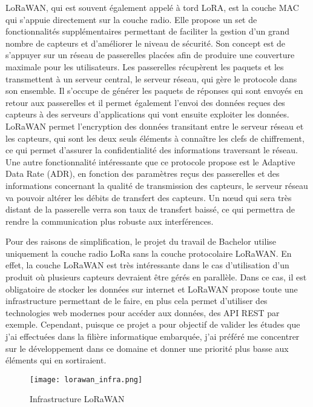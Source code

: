 LoRaWAN, qui est souvent également appelé à tord LoRA, est la couche MAC qui s'appuie directement sur la couche radio. Elle propose un set de fonctionnalités supplémentaires permettant de faciliter la gestion d'un grand nombre de capteurs et d'améliorer le niveau de sécurité. Son concept est de s'appuyer sur un réseau de passerelles placées afin de produire une couverture maximale pour les utilisateurs. Les passerelles récupèrent les paquets et les transmettent à un serveur central, le serveur réseau, qui gère le protocole dans son ensemble. Il s'occupe de générer les paquets de réponses qui sont envoyés en retour aux passerelles et il permet également l'envoi des données reçues des capteurs à des serveurs d'applications qui vont ensuite exploiter les données. LoRaWAN permet l'encryption des données transitant entre le serveur réseau et les capteurs, qui sont les deux seuls éléments à connaître les clefs de chiffrement, ce qui permet d'assurer la confidentialité des informations traversant le réseau. Une autre fonctionnalité intéressante que ce protocole propose est le Adaptive Data Rate (ADR), en fonction des paramètres reçus des passerelles et des informations concernant la qualité de transmission des capteurs, le serveur réseau va pouvoir altérer les débits de transfert des capteurs. Un nœud qui sera très distant de la passerelle verra son taux de transfert baissé, ce qui permettra de rendre la communication plus robuste aux interférences. \cite{lorawan_spec}

Pour des raisons de simplification, le projet du travail de Bachelor utilise uniquement la couche radio LoRa sans la couche protocolaire LoRaWAN. En effet, la couche LoRaWAN est très intéressante dans le cas d'utilisation d'un produit où plusieurs capteurs devraient être gérés en parallèle. Dans ce cas, il est obligatoire de stocker les données sur internet et LoRaWAN propose toute une infrastructure permettant de le faire, en plus cela permet d'utiliser des technologies web modernes pour accéder aux données, des API REST par exemple. Cependant, puisque ce projet a pour objectif de valider les études que j'ai effectuées dans la filière informatique embarquée, j'ai préféré me concentrer sur le développement dans ce domaine et donner une priorité plus basse aux éléments qui en sortiraient.

\begin{figure}[htb]
\centering 
\texttt{[image: lorawan\_infra.png]} 
\caption{Infrastructure LoRaWAN}
\label{fig:infra_lorawan}
\end{figure}